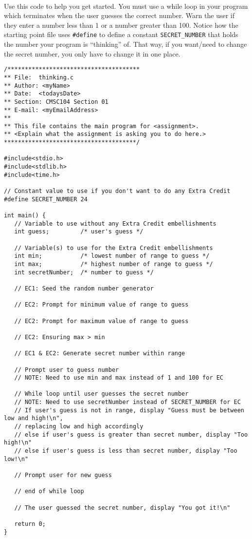 \documentclass[letter,11pt]{article}
\begin{document}
\paragraph{}Use this code to help you get started. You must use a while loop in your program which terminates when the user guesses the correct number. Warn the user if they enter a number less than 1 or a number greater than 100. Notice how the starting point file uses \texttt{\#define} to define a constant \texttt{SECRET\_NUMBER} that holds the number your program is ``thinking'' of. That way, if you want/need to change the secret number, you only have to change it in one place.
\begin{verbatim}
/**************************************
** File:  thinking.c
** Author: <myName>
** Date:  <todaysDate>
** Section: CMSC104 Section 01
** E-mail: <myEmailAddress>
**
** This file contains the main program for <assignment>.
** <Explain what the assignment is asking you to do here.>
**************************************/

#include<stdio.h>
#include<stdlib.h>
#include<time.h>

// Constant value to use if you don't want to do any Extra Credit
#define SECRET_NUMBER 24

int main() {
   // Variable to use without any Extra Credit embellishments
   int guess;         /* user's guess */

   // Variable(s) to use for the Extra Credit embellishments
   int min;           /* lowest number of range to guess */
   int max;           /* highest number of range to guess */
   int secretNumber;  /* number to guess */

   // EC1: Seed the random number generator

   // EC2: Prompt for minimum value of range to guess

   // EC2: Prompt for maximum value of range to guess
   
   // EC2: Ensuring max > min

   // EC1 & EC2: Generate secret number within range

   // Prompt user to guess number
   // NOTE: Need to use min and max instead of 1 and 100 for EC

   // While loop until user guesses the secret number
   // NOTE: Need to use secretNumber instead of SECRET_NUMBER for EC
   // If user's guess is not in range, display "Guess must be between low and high!\n",
   // replacing low and high accordingly
   // else if user's guess is greater than secret number, display "Too high!\n"
   // else if user's guess is less than secret number, display "Too low!\n"
      
   // Prompt user for new guess
      
   // end of while loop
   
   // The user guessed the secret number, display "You got it!\n"

   return 0;
}
\end{verbatim}
\end{document}
